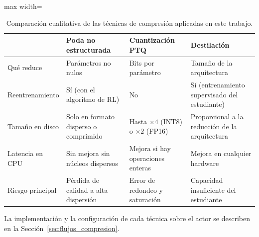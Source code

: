 \begin{table}[H]
	\centering
	\small
	\begin{adjustbox}{max width=\textwidth}
	\begin{tabular}{p{2.2cm}p{2.85cm}p{2.85cm}p{2.85cm}}
		\hline
		& \textbf{Poda no estructurada} & \textbf{Cuantización PTQ} & \textbf{Destilación} \\
		\hline
		Qué reduce & Parámetros no nulos & Bits por parámetro & Tamaño de la arquitectura \\
		\hspace{0pt}Reentrenamiento & Sí (con el algoritmo de RL) & No & Sí (entrenamiento supervisado del estudiante) \\
		Tamaño en disco & Solo en formato disperso o comprimido & Hasta $\times 4$ (INT8) o $\times 2$ (FP16) & Proporcional a la reducción de la arquitectura \\
		Latencia en CPU & Sin mejora sin núcleos dispersos & Mejora si hay operaciones enteras & Mejora en cualquier hardware \\
		Riesgo principal & Pérdida de calidad a alta dispersión & Error de redondeo y saturación & Capacidad insuficiente del estudiante \\
		\hline
	\end{tabular}
	\end{adjustbox}
	\caption{Comparación cualitativa de las técnicas de compresión aplicadas en este trabajo.}
	\label{tab:comp_tecnicas}
\end{table}

La implementación y la configuración de cada técnica sobre el actor se describen en la Sección~\ref{sec:flujos_compresion}.
